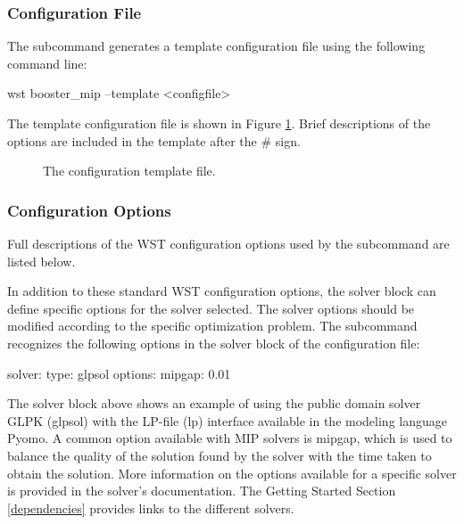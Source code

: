 \subsubsection{Configuration File}

The  subcommand generates a template configuration file using the following command line:

\begin{unknownListing}
wst booster_mip --template <configfile>
\end{unknownListing}

The  template configuration file is shown in Figure \ref{fig:booster_mip_template}.  
Brief descriptions of the options are included in the template after the \# sign.  
 
\begin{figure}[p!]
  \caption{The  configuration template file.}
  \label{fig:booster_mip_template}
\end{figure}

\subsubsection{Configuration Options}

Full descriptions of the WST configuration options used by the  subcommand are listed below.


In addition to these standard WST configuration options, the solver block can define 
specific options for the solver selected. The solver options should be modified 
according to the specific optimization problem. The  subcommand 
recognizes the following options in the solver block of the configuration file:
\begin{unknownListing}
solver:
  type: glpsol    
  options:
    mipgap: 0.01
\end{unknownListing}

The solver block above shows an example of using the 
public domain solver GLPK (glpsol) with the LP-file (lp) interface available 
in the modeling language Pyomo. A common option available with 
MIP solvers is mipgap, which is used to balance the quality of the solution 
found by the solver with the time taken to obtain the solution. More 
information on the options available for a specific solver is provided 
in the solver's documentation. The Getting Started 
Section \ref{dependencies} provides links to the different solvers.

